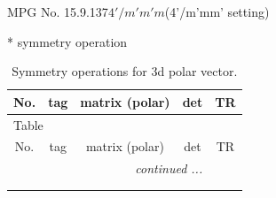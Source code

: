 \documentclass[fleqn,8pt]{jsarticle}
\begin{document}
\setcounter{MaxMatrixCols}{32}

\renewcommand{\tablename}{Table~}
\renewcommand{\figurename}{Figure~}
\begin{center}
\LARGE
MPG No. 15.9.137\quad$4'/m'm'm$\quad(4'/m'mm' setting)
\end{center}
* symmetry operation
\renewcommand{\arraystretch}{1.3}
\begin{longtable}{ccccc}
\caption{Symmetry operations for 3d polar vector.}
 \\
 \hline \hline
No. & tag & matrix (polar) & det & TR \\ \hline \endfirsthead

\multicolumn{4}{l}{\tablename\ \thetable{}} \\
 \hline \hline
No. & tag & matrix (polar) & det & TR \\ \hline \endhead

 \hline \hline
\multicolumn{4}{r}{\footnotesize\it continued ...} \\ \endfoot

 \hline \hline
\multicolumn{4}{r}{} \\ \endlastfoot


\end{longtable}
\end{document}
